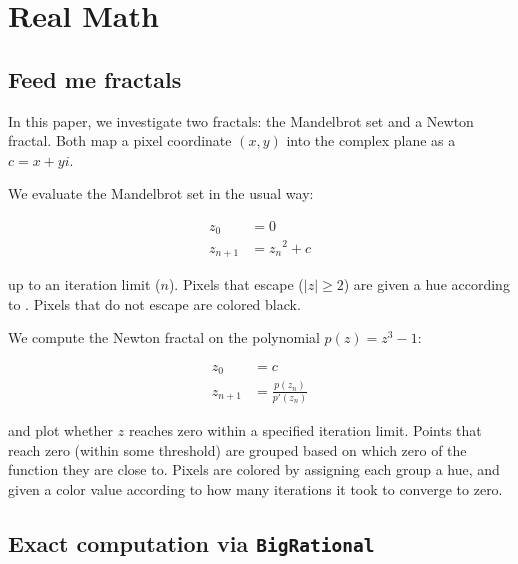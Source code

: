 \documentclass[sigconf,authorversion,nonacm]{acmart}
\begin{document}
\maketitle

\section{Real Math\protect\footnotemark}

\setcounter{subsection}{333984374}
\subsection{Feed me fractals}

In this paper, we investigate two fractals: the Mandelbrot set and a Newton
fractal. Both map a pixel coordinate $(x, y)$ into the complex plane as
a $c = x + yi$.

We evaluate the Mandelbrot set in the usual way:

\begin{align*} 
z_0     &= 0            \\
z_{n+1} &= {z_n}^2 + c
\end{align*}

\noindent up to an iteration limit ($n$).
Pixels that escape ($|z| \geq 2$) are given a
hue according to \cite{munafo:2023}. Pixels that do not escape are colored black.

We compute the Newton fractal on the polynomial $p(z) = z^3-1$:

\begin{align*}
z_0     &= c                        \\
z_{n+1} &= \frac{p(z_n)}{p'(z_n)}
\end{align*}

\noindent and plot whether $z$ reaches zero within a specified iteration limit.
Points that reach zero (within some threshold)
are grouped based on which zero of the function they are close to.
Pixels are colored by assigning each group a hue, and given a color value according to how many iterations it took to converge to zero.

\setcounter{subsection}{666015624}
\subsection{Exact computation via \texttt{BigRational}}
\end{document}
